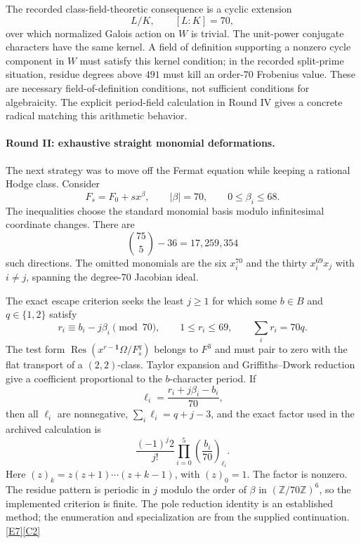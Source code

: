 \documentclass[11pt]{article}
\newcommand{\Z}{\mathbb Z}
\newcommand{\Res}{\operatorname{Res}}
\newcommand{\src}[1]{\hyperlink{src:#1}{[#1]}}
\begin{document}
The recorded class-field-theoretic consequence is a cyclic extension
\begin{equation}\label{hodge:abstract-field}
 L/K,\qquad [L:K]=70,
\end{equation}
over which normalized Galois action on $W$ is trivial. The unit-power
conjugate characters have the same kernel. A field of definition supporting
a nonzero cycle component in $W$ must satisfy this kernel condition; in the
recorded split-prime situation, residue degrees above $491$ must kill an
order-$70$ Frobenius value. These are necessary field-of-definition
conditions, not sufficient conditions for algebraicity. The explicit
period-field calculation in Round IV gives a concrete radical matching this
arithmetic behavior.

\paragraph{Round II: exhaustive straight monomial deformations.}
The next strategy was to move off the Fermat equation while keeping a
rational Hodge class. Consider
\[
 F_s=F_0+s x^\beta,\qquad |\beta|=70,\qquad0\le\beta_i\le68.
\]
The inequalities choose the standard monomial basis modulo infinitesimal
coordinate changes. There are
\begin{equation}\label{hodge:monomial-count}
 \binom{75}{5}-36=17,259,354
\end{equation}
such directions. The omitted monomials are the six $x_i^{70}$ and the thirty
$x_i^{69}x_j$ with $i\ne j$, spanning the degree-$70$ Jacobian ideal.

The exact escape criterion seeks the least $j\ge1$ for which some $b\in B$
and $q\in\{1,2\}$ satisfy
\begin{equation}\label{hodge:escape}
 r_i\equiv b_i-j\beta_i\pmod{70},\qquad
 1\le r_i\le69,\qquad\sum_i r_i=70q.
\end{equation}
The test form $\Res(x^{r-\mathbf1}\Omega/F_s^q)$ belongs to $F^3$ and must
pair to zero with the flat transport of a $(2,2)$-class. Taylor expansion and
Griffiths--Dwork reduction give a coefficient proportional to the
$b$-character period. If
\[
 \ell_i=\frac{r_i+j\beta_i-b_i}{70},
\]
then all $\ell_i$ are nonnegative, $\sum_i\ell_i=q+j-3$, and the exact
factor used in the archived calculation is
\begin{equation}\label{hodge:reduction-factor}
 \frac{(-1)^j2}{j!}\prod_{i=0}^{5}
       \left(\frac{b_i}{70}\right)_{\ell_i}.
\end{equation}
Here $(z)_k=z(z+1)\cdots(z+k-1)$, with $(z)_0=1$. The factor is nonzero.
The residue pattern is periodic in $j$ modulo the order of $\beta$ in
$(\Z/70\Z)^6$, so the implemented criterion is finite. The pole reduction
identity is an established method; the enumeration and specialization are
from the supplied continuation.\src{E7}\src{C2}
\end{document}
